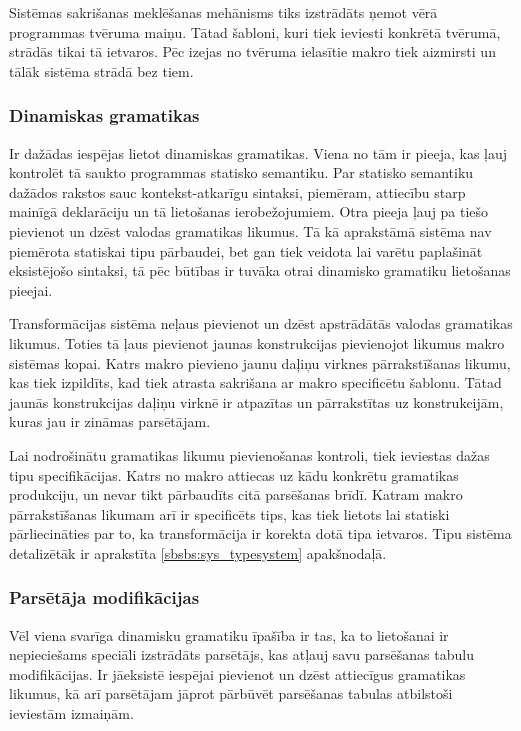 Sistēmas sakrišanas meklēšanas mehānisms tiks izstrādāts ņemot vērā programmas tvēruma maiņu. Tātad šabloni, kuri tiek ieviesti konkrētā tvērumā, strādās tikai tā ietvaros. Pēc izejas no tvēruma ielasītie makro tiek aizmirsti un tālāk sistēma strādā bez tiem.

\subsubsection{\label{sbsbs:sys_dynamicgrammars}Dinamiskas gramatikas}

Ir dažādas iespējas lietot dinamiskas gramatikas. Viena no tām ir pieeja, kas ļauj kontrolēt tā saukto programmas statisko semantiku. Par statisko semantiku dažādos rakstos sauc kontekst-atkarīgu sintaksi, piemēram, attiecību starp mainīgā deklarāciju un tā lietošanas ierobežojumiem. Otra pieeja ļauj pa tiešo pievienot un dzēst valodas gramatikas likumus. Tā kā aprakstāmā sistēma nav piemērota statiskai tipu pārbaudei, bet gan tiek veidota lai varētu paplašināt eksistējošo sintaksi, tā pēc būtības ir tuvāka otrai dinamisko gramatiku lietošanas pieejai.

Transformācijas sistēma neļaus pievienot un dzēst apstrādātās valodas gramatikas likumus. Toties tā ļaus pievienot jaunas konstrukcijas pievienojot likumus makro sistēmas kopai. Katrs makro pievieno jaunu daļiņu virknes pārrakstīšanas likumu, kas tiek izpildīts, kad tiek atrasta sakrišana ar makro specificētu šablonu. Tātad jaunās konstrukcijas daļiņu virknē ir atpazītas un pārrakstītas uz konstrukcijām, kuras jau ir zināmas parsētājam.

Lai nodrošinātu gramatikas likumu pievienošanas kontroli, tiek ieviestas dažas tipu specifikācijas. Katrs no makro attiecas uz kādu konkrētu gramatikas produkciju, un nevar tikt pārbaudīts citā parsēšanas brīdī. Katram makro pārrakstīšanas likumam arī ir specificēts tips, kas tiek lietots lai statiski pārliecināties par to, ka transformācija ir korekta dotā tipa ietvaros. Tipu sistēma detalizētāk ir aprakstīta \ref{sbsbs:sys_typesystem} apakšnodaļā.

\subsubsection{\label{sbsbs:sys_parsermodifications}Parsētāja modifikācijas}

Vēl viena svarīga dinamisku gramatiku īpašība ir tas, ka to lietošanai ir nepieciešams speciāli izstrādāts parsētājs, kas atļauj savu parsēšanas tabulu modifikācijas. Ir jāeksistē iespējai pievienot un dzēst attiecīgus gramatikas likumus, kā arī parsētājam jāprot pārbūvēt parsēšanas tabulas atbilstoši ieviestām izmaiņām.

